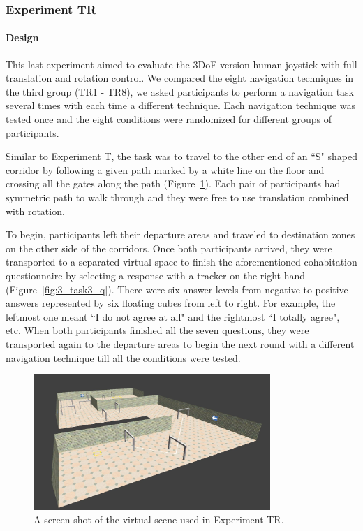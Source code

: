 \subsubsection{Experiment TR}

\paragraph{Design}
This last experiment aimed to evaluate the 3DoF version human joystick with full translation and rotation control. We compared the eight navigation techniques in the third group (TR1 - TR8), we asked participants to perform a navigation task several times with each time a different technique. Each navigation technique was tested once and the eight conditions were randomized for different groups of participants.

Similar to Experiment T, the task was to travel to the other end of an ``S" shaped corridor by following a given path marked by a white line on the floor and crossing all the gates along the path (Figure~\ref{fig:3_task3}). Each pair of participants had symmetric path to walk through and they were free to use translation combined with rotation.

To begin, participants left their departure areas and traveled to destination zones on the other side of the corridors. Once both participants arrived, they were transported to a separated virtual space to finish the aforementioned cohabitation questionnaire by selecting a response with a tracker on the right hand (Figure~\ref{fig:3_task3_q}). There were six answer levels from negative to positive answers represented by six floating cubes from left to right. For example, the leftmost one meant ``I do not agree at all" and the rightmost ``I totally agree", etc.  When both participants finished all the seven questions, they were transported again to the departure areas to begin the next round with a different navigation technique till all the conditions were tested.

\begin{figure}[tb]
  \centering
  \includegraphics[width=0.8\textwidth]{figures/3_t3}
  \caption{\label{fig:3_task3}A screen-shot of the virtual scene used in Experiment TR.}
\end{figure}

